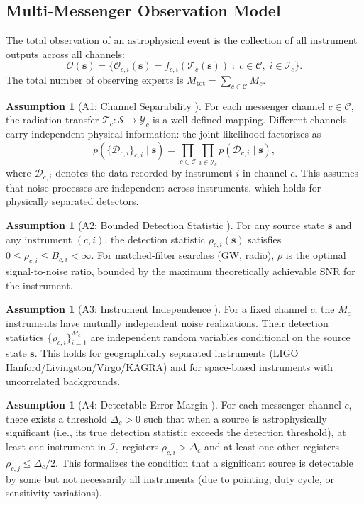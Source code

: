 \documentclass[11pt,a4paper]{article}
\theoremstyle{definition}
\newtheorem{assumption}[theorem]{Assumption}
\newcommand{\cY}{\mathcal{Y}}
\newcommand{\cS}{\mathcal{S}}
\begin{document}
\subsection{Multi-Messenger Observation Model}
The total observation of an astrophysical event is the collection of all instrument outputs across all channels:
\begin{equation}\label{eq:total_obs}
\mathcal{O}(\mathbf{s}) = \bigl\{ \mathcal{O}_{c,i}(\mathbf{s}) = f_{c,i}(\mathcal{T}_c(\mathbf{s})) \;:\; c \in \mathcal{C}, \; i \in \mathcal{I}_c \bigr\}.
\end{equation}
The total number of observing experts is $M_{\mathrm{tot}} = \sum_{c \in \mathcal{C}} M_c$.
\begin{assumption}[A1: Channel Separability ]\label{ass:A1}
For each messenger channel $c \in \mathcal{C}$, the radiation transfer $\mathcal{T}_c: \cS \to \cY_c$ is a well-defined mapping. Different channels carry independent physical information: the joint likelihood factorizes as
\begin{equation}\label{eq:likelihood_factor}
p(\{\mathcal{D}_{c,i}\}_{c,i} \mid \mathbf{s}) = \prod_{c \in \mathcal{C}} \prod_{i \in \mathcal{I}_c} p(\mathcal{D}_{c,i} \mid \mathbf{s}),
\end{equation}
where $\mathcal{D}_{c,i}$ denotes the data recorded by instrument $i$ in channel $c$. This assumes that noise processes are independent across instruments, which holds for physically separated detectors.
\end{assumption}
\begin{assumption}[A2: Bounded Detection Statistic ]\label{ass:A2}
For any source state $\mathbf{s}$ and any instrument $(c,i)$, the detection statistic $\rho_{c,i}(\mathbf{s})$ satisfies $0 \leq \rho_{c,i} \leq B_{c,i} < \infty$. For matched-filter searches (GW, radio), $\rho$ is the optimal signal-to-noise ratio, bounded by the maximum theoretically achievable SNR for the instrument.
\end{assumption}
\begin{assumption}[A3: Instrument Independence ]\label{ass:A3}
For a fixed channel $c$, the $M_c$ instruments have mutually independent noise realizations. Their detection statistics $\{\rho_{c,i}\}_{i=1}^{M_c}$ are independent random variables conditional on the source state $\mathbf{s}$. This holds for geographically separated instruments (LIGO Hanford/Livingston/Virgo/KAGRA) and for space-based instruments with uncorrelated backgrounds.
\end{assumption}
\begin{assumption}[A4: Detectable Error Margin ]\label{ass:A4}
For each messenger channel $c$, there exists a threshold $\Delta_c > 0$ such that when a source is astrophysically significant (i.e., its true detection statistic exceeds the detection threshold), at least one instrument in $\mathcal{I}_c$ registers $\rho_{c,i} > \Delta_c$ and at least one other registers $\rho_{c,j} \leq \Delta_c/2$. This formalizes the condition that a significant source is detectable by some but not necessarily all instruments (due to pointing, duty cycle, or sensitivity variations).
\end{assumption}
\end{document}
